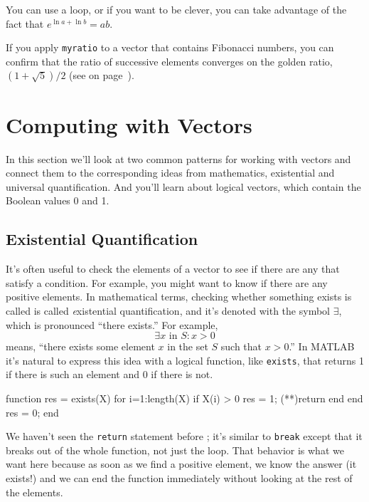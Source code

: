 You can use a loop, or if you want to be clever, you can take
advantage of the fact that $e^{\ln a + \ln b} = a b$.

If you apply \lstinline{myratio} to a vector that contains Fibonacci
numbers, you can confirm that the ratio of successive elements
converges on the golden ratio, $(1+\sqrt{5})/2$ (see
 on page~\pageref{fibratio}).



\section{Computing with Vectors}

In this section we'll look at two common patterns for working with vectors and connect them to the corresponding ideas from mathematics, existential and universal quantification.  And you'll learn about logical vectors, which contain the Boolean values 0 and 1. 

\subsection{Existential Quantification}


It's often useful to check the elements of a vector to see if there
are any that satisfy a condition.  For example, you might want to
know if there are any positive elements.  In mathematical terms, checking whether something exists is called is called {\emph existential quantification}, and it's denoted with
the symbol $\exists$, which is pronounced ``there exists.''  For example,
%
\[ \exists x \mbox{~in~} S: x>0  \]
%
means, ``there exists some element $x$ in the set $S$ such that
$x>0$.''  In MATLAB it's natural to express this idea with a logical
function, like \lstinline{exists}, that returns 1 if there is such an
element and 0 if there is not.

\begin{code}
function res = exists(X)
    for i=1:length(X)
        if X(i) > 0
            res = 1;
            (**)return
        end
    end
    res = 0;
end
\end{code}

We haven't seen the \lstinline{return} statement before ; it's similar
to \lstinline{break} except that it breaks out of the whole function, not
just the loop.  That behavior is what we want here because as soon
as we find a positive element, we know the answer (it exists!) and
we can end the function immediately without looking at the rest
of the elements.

